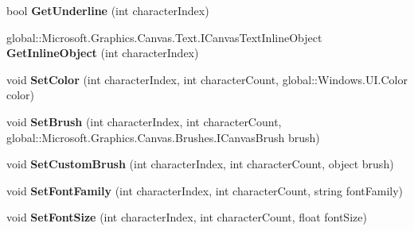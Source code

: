 \begin{DoxyCompactItemize}
bool {\bfseries Get\+Underline} (int character\+Index)
\item 
\mbox{\label{interface_microsoft_1_1_graphics_1_1_canvas_1_1_text_1_1_i_canvas_text_layout_adbed17232322b4f7cb159ed09f3ed328}} 
global\+::\+Microsoft.\+Graphics.\+Canvas.\+Text.\+I\+Canvas\+Text\+Inline\+Object {\bfseries Get\+Inline\+Object} (int character\+Index)
\item 
\mbox{\label{interface_microsoft_1_1_graphics_1_1_canvas_1_1_text_1_1_i_canvas_text_layout_abf05e047c6100a7211eb7e3412bb3762}} 
void {\bfseries Set\+Color} (int character\+Index, int character\+Count, global\+::\+Windows.\+U\+I.\+Color color)
\item 
\mbox{\label{interface_microsoft_1_1_graphics_1_1_canvas_1_1_text_1_1_i_canvas_text_layout_a7f915acfc4ff40f7d367cb38220d6cbd}} 
void {\bfseries Set\+Brush} (int character\+Index, int character\+Count, global\+::\+Microsoft.\+Graphics.\+Canvas.\+Brushes.\+I\+Canvas\+Brush brush)
\item 
\mbox{\label{interface_microsoft_1_1_graphics_1_1_canvas_1_1_text_1_1_i_canvas_text_layout_aeddfc3e7e513bcfa6c67e5a5139a3558}} 
void {\bfseries Set\+Custom\+Brush} (int character\+Index, int character\+Count, object brush)
\item 
\mbox{\label{interface_microsoft_1_1_graphics_1_1_canvas_1_1_text_1_1_i_canvas_text_layout_aa9cb4ef464927909fcb48d72a4703b8a}} 
void {\bfseries Set\+Font\+Family} (int character\+Index, int character\+Count, string font\+Family)
\item 
\mbox{\label{interface_microsoft_1_1_graphics_1_1_canvas_1_1_text_1_1_i_canvas_text_layout_a8b0dd44121dd43e004f96f5df2498994}} 
void {\bfseries Set\+Font\+Size} (int character\+Index, int character\+Count, float font\+Size)
\item 
\mbox{\label{interface_microsoft_1_1_graphics_1_1_canvas_1_1_text_1_1_i_canvas_text_layout_a516ffa415e1689e878df56a857176c9a}} 

\end{DoxyCompactItemize}
